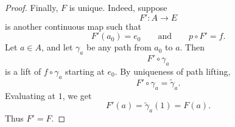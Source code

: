 \documentclass{article}
\begin{document}
\begin{proof}
Finally, \(F\) is unique. Indeed, suppose
\[
F' : A \to E
\]
is another continuous map such that
\[
F'(a_0)=e_0
\qquad\text{and}\qquad
p\circ F'=f.
\]
Let \(a\in A\), and let \(\gamma_a\) be any path from \(a_0\) to \(a\). Then
\[
F'\circ \gamma_a
\]
is a lift of \(f\circ \gamma_a\) starting at \(e_0\). By uniqueness of path lifting,
\[
F'\circ \gamma_a=\widetilde{\gamma}_a.
\]
Evaluating at \(1\), we get
\[
F'(a)=\widetilde{\gamma}_a(1)=F(a).
\]
Thus \(F'=F\).
\end{proof}
\end{document}

